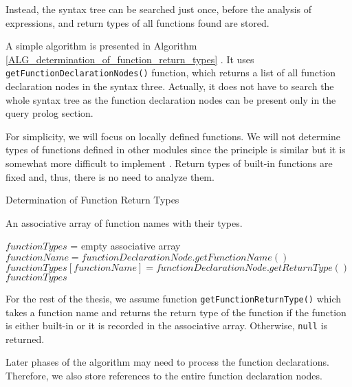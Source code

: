 Instead, the syntax tree can be searched just once, before the analysis of expressions, and return types of all functions found are stored.

A simple algorithm is presented in Algorithm \ref{ALG_determination_of_function_return_types} . It uses \texttt{getFunctionDeclarationNodes()} function, which returns a list of all function declaration nodes in the syntax three. Actually, it does not have to search the whole syntax tree as the function declaration nodes can be present only in the query prolog section. 

For simplicity, we will focus on locally defined functions. We will not determine types of functions defined in other modules since the principle is similar but it is somewhat more difficult to implement . Return types of built-in functions are fixed and, thus, there is no need to analyze them.

\begin{algorithm}
\caption{Determination of Function Return Types}
\label{ALG_determination_of_function_return_types}
\begin{algorithmic}[1]
\ENSURE An associative array of function names with their types.

\STATE $functionTypes$ = empty associative array
    \STATE $functionName = functionDeclarationNode.getFunctionName()$
    \STATE $functionTypes[functionName] = functionDeclarationNode.getReturnType()$
\ENDFOR
\RETURN $functionTypes$
\end{algorithmic}
\end{algorithm}

For the rest of the thesis, we assume function  \texttt{getFunctionReturnType()} which takes a function name and returns the return type of the function if the function is either built-in or it is recorded in the associative array. Otherwise, \texttt{null} is returned.

Later phases of the algorithm may need to process the function declarations. Therefore, we also store references to the entire function declaration nodes.

